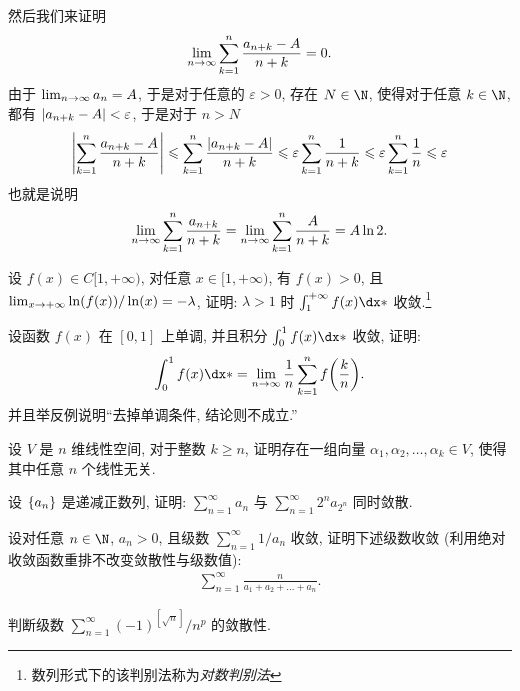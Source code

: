 \begin{exercise}[series=exer]
\begin{answer}
      然后我们来证明
      \begin{align*}
          \lim_{n \to \infty}\sum_{k = 1}^{n} \frac{a_{n + k} - A}{n + k} = 0.
      \end{align*}
      由于 $ \lim_{n \to \infty}a_{n} = A $, 于是对于任意的 $ \varepsilon > 0 $, 存在 $ N \in \N $, 使得对于任意 $ k \in \N $, 都有 $ \abs{a_{n + k} - A} < \varepsilon $, 于是对于 $ n > N $
      \begin{align*}
          \abs{\sum_{k = 1}^{n} \frac{a_{n + k} - A}{n + k}} \leqslant \sum_{k = 1}^{n} \frac{\abs{a_{n + k} - A}}{n + k} \leqslant \varepsilon \sum_{k = 1}^{n} \frac{1}{n + k} \leqslant \varepsilon\sum_{k = 1}^{n} \frac{1}{n} \leqslant \varepsilon
      \end{align*}
      也就是说明
      \begin{align*}
          \lim_{n \to \infty} \sum_{k = 1}^{n}\frac{a_{n + k}}{n + k} = \lim_{n \to \infty} \sum_{k = 1}^{n}\frac{A}{n + k} = A\ln 2.
      \end{align*}
  \end{answer}
  \item 设 $ f(x) \in C[1, +\infty) $, 对任意 $ x\in [1, +\infty) $, 有 $ f(x) > 0 $, 且 $ \lim_{x \to +\infty} \ln(f(x))/\ln(x) = -\lambda $, 证明: $ \lambda > 1 $ 时 $ \int_{1}^{+\infty} f(x) \dx* $ 收敛.\footnote{数列形式下的该判别法称为\emph{对数判别法}}
  \item 设函数 $ f(x) $ 在 $ [0, 1] $ 上单调, 并且积分 $ \int_{0}^{1} f(x) \dx* $ 收敛, 证明:
  \begin{align*}
      \int_{0}^{1} f(x) \dx* = \limit{n}{\infty} \frac{1}{n} \sum_{k=1}^{n} f\qty(\frac{k}{n}).
  \end{align*}
  并且举反例说明``去掉单调条件, 结论则不成立.''
  \item 设 $ V $ 是 $ n $ 维线性空间, 对于整数 $ k \ge n $, 证明存在一组向量 $ \alpha_{1}, \alpha_{2}, \dots, \alpha_{k} \in V $, 使得其中任意 $ n $ 个线性无关.
  \item 设 $ \qty{a_{n}} $ 是递减正数列, 证明: $ \sum_{n=1}^{\infty}a_{n} $ 与 $ \sum_{n=1}^{\infty}2^{n}a_{2^{n}} $ 同时敛散.
  \item 设对任意 $ n\in \N $, $ a_{n} > 0 $, 且级数 $ \sum_{n=1}^{\infty}1/a_{n} $ 收敛, 证明下述级数收敛 (利用绝对收敛函数重排不改变敛散性与级数值):
  \begin{align*}
      \sum_{n=1}^{\infty}\frac{n}{a_{1} + a_{2} + \dots + a_{n}}.
  \end{align*}
  \item 判断级数 $ \sum_{n=1}^{\infty} (-1)^{[\sqrt{n}]}/n^{p} $ 的敛散性.

\end{exercise}
